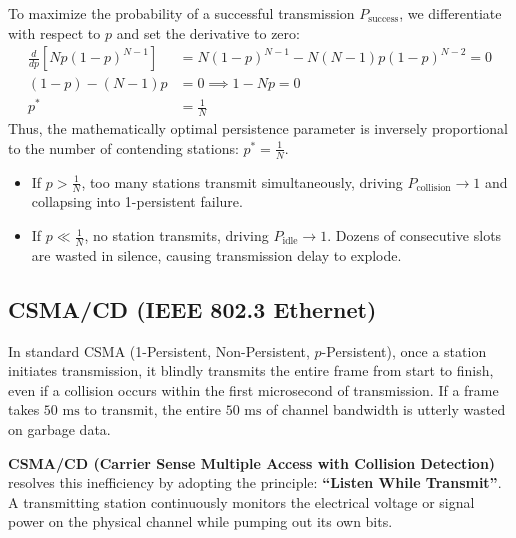 \documentclass[12pt, a4paper]{article}
\begin{document}
To maximize the probability of a successful transmission $P_{\text{success}}$, we differentiate with respect to $p$ and set the derivative to zero:
\begin{align}
    \frac{d}{dp} \left[ N p (1 - p)^{N - 1} \right] &= N (1 - p)^{N - 1} - N(N - 1) p (1 - p)^{N - 2} = 0 \\
    (1 - p) - (N - 1) p &= 0 \implies 1 - N p = 0 \\
    p^* &= \frac{1}{N}
\end{align}
Thus, the mathematically optimal persistence parameter is inversely proportional to the number of contending stations: $p^* = \frac{1}{N}$.
\begin{itemize}
    \item If $p > \frac{1}{N}$, too many stations transmit simultaneously, driving $P_{\text{collision}} \to 1$ and collapsing into 1-persistent failure.
    \item If $p \ll \frac{1}{N}$, no station transmits, driving $P_{\text{idle}} \to 1$. Dozens of consecutive slots are wasted in silence, causing transmission delay to explode.
\end{itemize}

\subsection{CSMA/CD (IEEE 802.3 Ethernet)}
In standard CSMA (1-Persistent, Non-Persistent, $p$-Persistent), once a station initiates transmission, it blindly transmits the entire frame from start to finish, even if a collision occurs within the first microsecond of transmission. If a frame takes $50\text{ ms}$ to transmit, the entire $50\text{ ms}$ of channel bandwidth is utterly wasted on garbage data.

\textbf{CSMA/CD (Carrier Sense Multiple Access with Collision Detection)} resolves this inefficiency by adopting the principle: \textbf{``Listen While Transmit''}. A transmitting station continuously monitors the electrical voltage or signal power on the physical channel while pumping out its own bits. 
\end{document}
